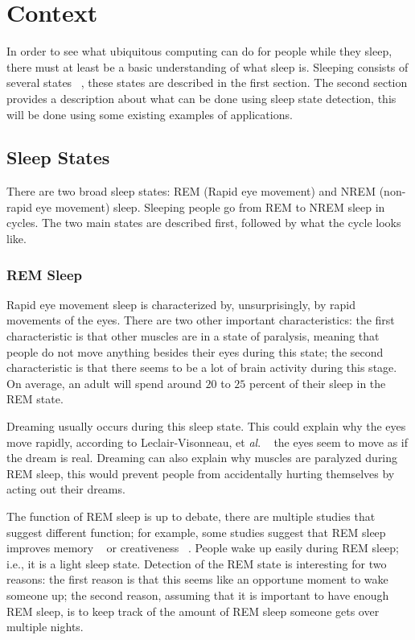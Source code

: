 \chapter{Context} %
\label{cha:context}
In order to see what ubiquitous computing can do for people while they sleep, there must at least be a basic understanding of what sleep is. Sleeping consists of several states ~\cite{Silber:2007fk}, these states are described in the first section. The second section provides a description about what can be done using sleep state detection, this will be done using some existing examples of applications.
 
\section{Sleep States} %
\label{sec:sleep_states}
There are two broad sleep states: REM (Rapid eye movement) and NREM (non-rapid eye movement) sleep. Sleeping people go from REM to NREM sleep in cycles. The two main states are described first, followed by what the cycle looks like.

\subsection{REM Sleep} %
\label{sub:rem_sleep}
Rapid eye movement sleep is characterized by, unsurprisingly, by rapid movements of the eyes. There are two other important characteristics: the first characteristic is that other muscles are in a state of paralysis, meaning that people do not move anything besides their eyes during this state; the second characteristic is that there seems to be a lot of brain activity during this stage. On average, an adult will spend around $20$ to $25$ percent of their sleep in the REM state.

Dreaming usually occurs during this sleep state. This could explain why the eyes move rapidly, according to Leclair-Visonneau, et \emph{al}. ~\cite{LeclairVisonneau:2010:Brain:20478849} the eyes seem to move as if the dream is real. Dreaming can also explain why muscles are paralyzed during REM sleep, this would prevent people from accidentally hurting themselves by acting out their dreams.

The function of REM sleep is up to debate, there are multiple studies that suggest different function; for example, some studies suggest that REM sleep improves memory ~\cite{Marshall:2006:Nature:17086200} or creativeness ~\cite{Wagner:2004:Nature:14737168}. People wake up easily during REM sleep; i.e., it is a light sleep state. Detection of the REM state is interesting for two reasons: the first reason is that this seems like an opportune moment to wake someone up; the second reason, assuming that it is important to have enough REM sleep, is to keep track of the amount of REM sleep someone gets over multiple nights.

